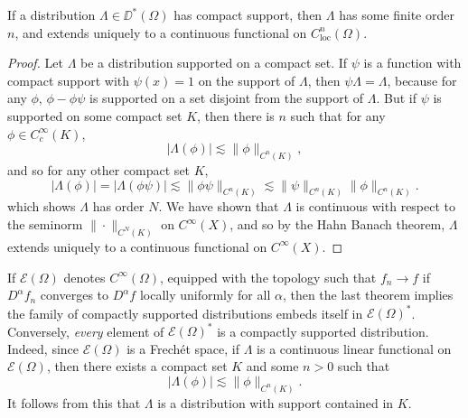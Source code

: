 \begin{theorem}
    If a distribution $\Lambda \in \DD^*(\Omega)$ has compact support, then $\Lambda$ has some finite order $n$, and extends uniquely to a continuous functional on $C^n_{\text{loc}}(\Omega)$.
\end{theorem}
\begin{proof}
    Let $\Lambda$ be a distribution supported on a compact set. If $\psi$ is a function with compact support with $\psi(x) = 1$ on the support of $\Lambda$, then $\psi \Lambda = \Lambda$, because for any $\phi$, $\phi - \phi \psi$ is supported on a set disjoint from the support of $\Lambda$. But if $\psi$ is supported on some compact set $K$, then there is $n$ such that for any $\phi \in C_c^\infty(K)$,
    \[ |\Lambda(\phi)| \lesssim \| \phi \|_{C^n(K)}, \]
    and so for any other compact set $K$,
    \[ |\Lambda(\phi)| = |\Lambda(\phi \psi)| \lesssim \| \phi \psi \|_{C^n(K)} \lesssim \| \psi \|_{C^n(K)} \| \phi \|_{C^n(K)}. \]
    which shows $\Lambda$ has order $N$. We have shown that $\Lambda$ is continuous with respect to the seminorm $\| \cdot \|_{C^N(K)}$ on $C^\infty(X)$, and so by the Hahn Banach theorem, $\Lambda$ extends uniquely to a continuous functional on $C^\infty(X)$.
\end{proof}

If $\mathcal{E}(\Omega)$ denotes $C^\infty(\Omega)$, equipped with the topology such that $f_n \to f$ if $D^\alpha f_n$ converges to $D^\alpha f$ locally uniformly for all $\alpha$, then the last theorem implies the family of compactly supported distributions embeds itself in $\mathcal{E}(\Omega)^*$. Conversely, \emph{every} element of $\mathcal{E}(\Omega)^*$ is a compactly supported distribution. Indeed, since $\mathcal{E}(\Omega)$ is a Frech\'{e}t space, if $\Lambda$ is a continuous linear functional on $\mathcal{E}(\Omega)$, then there exists a compact set $K$ and some $n > 0$ such that
%
\[ |\Lambda(\phi)| \lesssim \| \phi \|_{C^n(K)}. \]
%
It follows from this that $\Lambda$ is a distribution with support contained in $K$.

